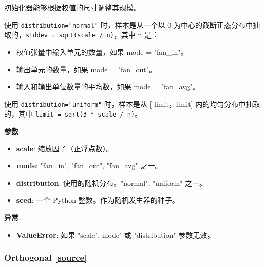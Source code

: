初始化器能够根据权值的尺寸调整其规模。

使用 \texttt{distribution="normal"} 时，样本是从一个以 0
为中心的截断正态分布中抽取的，\texttt{stddev\ =\ sqrt(scale\ /\ n)}，其中
n 是：

\begin{itemize}
\tightlist
\item
  权值张量中输入单元的数量，如果 mode = "fan\_in"。
\item
  输出单元的数量，如果 mode = "fan\_out"。
\item
  输入和输出单位数量的平均数，如果 mode = "fan\_avg"。
\end{itemize}

使用 \texttt{distribution="uniform"} 时，样本是从 {[}-limit，limit{]}
内的均匀分布中抽取的，其中 \texttt{limit\ =\ sqrt(3\ *\ scale\ /\ n)}。

\textbf{参数}

\begin{itemize}
\tightlist
\item
  \textbf{scale}: 缩放因子（正浮点数）。
\item
  \textbf{mode}: "fan\_in", "fan\_out", "fan\_avg" 之一。
\item
  \textbf{distribution}: 使用的随机分布。"normal", "uniform" 之一。
\item
  \textbf{seed}: 一个 Python 整数。作为随机发生器的种子。
\end{itemize}

\textbf{异常}

\begin{itemize}
\tightlist
\item
  \textbf{ValueError}: 如果 "scale", mode" 或 "distribution" 参数无效。
\end{itemize}




\subsubsection{Orthogonal {\href{https://github.com/keras-team/keras/blob/master/keras/initializers.py\#L228}{{[}source{]}}}}

\begin{Shaded}
\begin{Highlighting}[]
\OperatorTok{=}\OperatorTok{=}\NormalTok{)}
\end{Highlighting}
\end{Shaded}

